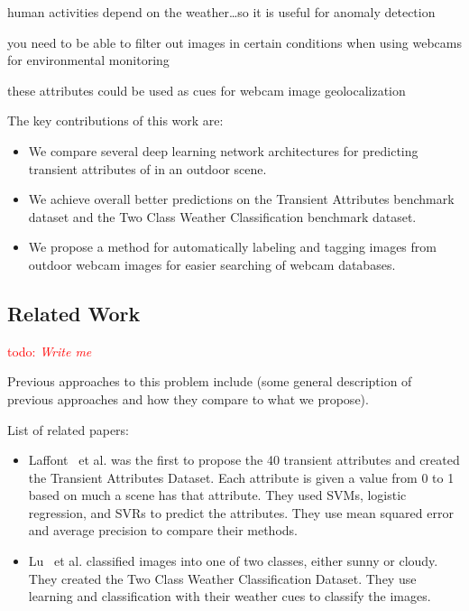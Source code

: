 \documentclass{article}
\newcommand{\todo}[1]{\textcolor{red}{todo: {\em #1}}}
\begin{document}
human activities depend on the weather\dots so it is useful for
anomaly detection~\cite{abrams12lost}

you need to be able to filter out images in certain conditions when
using webcams for environmental monitoring~\cite{jacobs09webcamgis}

these attributes could be used as cues for webcam image
geolocalization~\cite{jacobs07geolocate}


The key contributions of this work are:
\begin{itemize}

  \item We compare several deep learning network architectures for
    		predicting transient attributes of in an outdoor scene.

	\item We achieve overall better predictions on the Transient Attributes
				benchmark dataset and the Two Class Weather Classification 
				benchmark dataset.

	\item We propose a method for automatically labeling and tagging images
				from outdoor webcam images for easier searching of webcam databases.



\end{itemize}

\subsection{Related Work}

\todo{Write me}

Previous approaches to this problem include (some general description
of previous approaches and how they compare to what we propose).

List of related papers:
\begin{itemize}

	\item Laffont~\cite{Laffont14} et al. was the first to propose the 40
		transient attributes and created the Transient Attributes Dataset.
		Each attribute is given a value from 0 to 1 based on much a scene
		has that attribute. 	They used SVMs, logistic regression, and SVRs 
		to predict the attributes.  They use mean squared error and average 
		precision to compare their methods.

	\item Lu~\cite{lutwoclass} et al. classified images into one of two 
		classes, either sunny or cloudy.  They created the Two Class 
		Weather Classification Dataset.  They use learning and classification
		with their weather cues to classify the images. 

\end{itemize}
\end{document}

